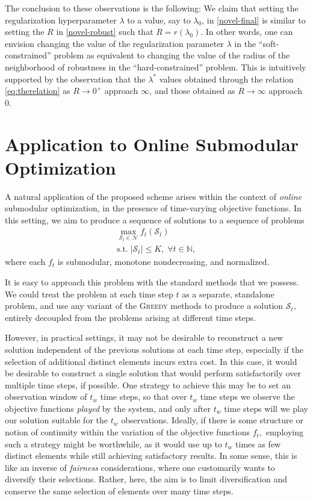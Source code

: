 \documentclass[letter,11pt]{article}
\def\sS{\mathcal{S}}
\def\sN{\mathcal{N}}
\begin{document}
The conclusion to these observations is the following: We claim that setting the regularization hyperparameter $\lambda$ to a value, say to $\lambda_0$, in \eqref{novel-final} is similar to setting the $R$ in \eqref{novel-robust} such that $R = r(\lambda_0)$. In other words, one can envision changing the value of the regularization parameter $\lambda$ in the ``soft-constrained'' problem as equivalent to changing the value of the radius of the neighborhood of robustness in the ``hard-constrained'' problem. This is intuitively supported by the observation that the $\lambda^\ast$ values obtained through the relation \eqref{eq:therelation} as $R\to 0^+$ approach $\infty$, and those obtained as $R\to\infty$ approach $0$.
\section{Application to Online Submodular Optimization}\label{sec:online}
A natural application of the proposed scheme arises within the context of \textit{online} submodular optimization, in the presence of time-varying objective functions. In this setting, we aim to produce a sequence of solutions to a sequence of problems
\begin{equation}
\begin{gathered}
\max_{\sS_t \in \sN} f_t(\sS_t) \\
\text{s.t.}\; \lvert \sS_t \rvert \leq K, \; \forall t \in \mathbb{N},
\end{gathered}
\end{equation}
where each $f_t$ is submodular, monotone nondecreasing, and normalized.

It is easy to approach this problem with the standard methods that we possess. We could treat the problem at each time step $t$ as a separate, standalone problem, and use any variant of the \textsc{Greedy} methods to produce a solution $\sS_t,$ entirely decoupled from the problems arising at different time steps.

However, in practical settings, it may not be desirable to reconstruct a new solution independent of the previous solutions at each time step, especially if the selection of additional distinct elements incurs extra cost. In this case, it would be desirable to construct a single solution that would perform satisfactorily over multiple time steps, if possible. One strategy to achieve this may be to set an observation window of $t_w$ time steps, so that over $t_w$ time steps we observe the objective functions \textit{played} by the system, and only after $t_w$ time steps will we play our solution suitable for the $t_w$ observations. Ideally, if there is some structure or notion of continuity within the variation of the objective functions $f_t,$ employing such a strategy might be worthwhile, as it would use up to $t_w$ times as few distinct elements while still achieving satisfactory results. In some sense, this is like an inverse of \textit{fairness} considerations, where one customarily wants to diversify their selections. Rather, here, the aim is to limit diversification and conserve the same selection of elements over many time steps.
\end{document}

